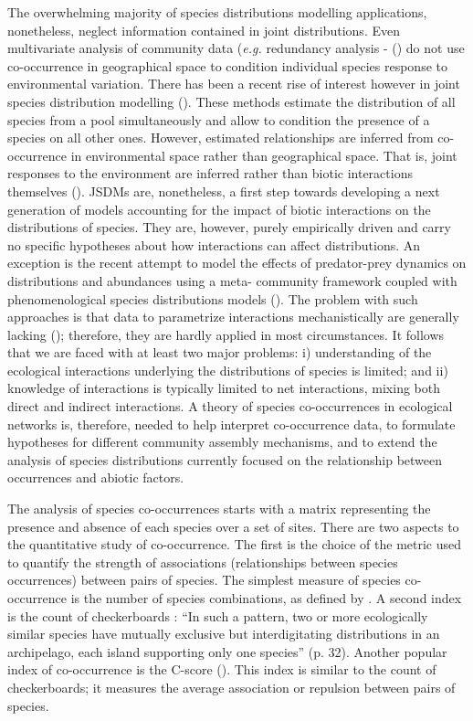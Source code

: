 The overwhelming majority of species distributions modelling applications, nonetheless, neglect information contained in joint distributions. Even multivariate analysis of community data (\textit{e.g.} redundancy analysis - (\citealt{Legendre2012Numerical}) do not use co-occurrence in geographical space to condition individual species response to environmental variation.  There has been a recent rise of interest however in joint species distribution modelling (\citealt{Clark2014More, Harris2015Estimating, Pollock2014Understanding}). These methods estimate the distribution of all species from a pool simultaneously and allow to condition the presence of a species on all other ones. However, estimated relationships are inferred from co-occurrence in environmental space rather than geographical space. That is, joint responses to the environment are inferred rather than biotic interactions themselves (\citealt{Baselga2009Individualistic}). JSDMs are, nonetheless, a first step towards developing a next generation of models accounting for the impact of biotic interactions on the distributions of species. They are, however, purely empirically driven and carry no specific hypotheses about how interactions can affect distributions. An exception is the recent attempt to model the effects of predator-prey dynamics on distributions and abundances using a meta- community framework coupled with phenomenological species distributions models (\citealt{Fordham2013Adapted}). The problem with such approaches is that data to parametrize interactions mechanistically are generally lacking (\citealt{Castilla2015Inferring}); therefore, they are hardly applied in most circumstances. It follows that we are faced with at least two major problems: i) understanding of the ecological interactions underlying the distributions of species is limited; and ii) knowledge of interactions is typically limited to net interactions, mixing both direct and indirect interactions. A theory of species co-occurrences in ecological networks is, therefore, needed to help interpret co-occurrence data, to formulate hypotheses for different community assembly mechanisms, and to extend the analysis of species distributions currently focused on the relationship between occurrences and abiotic factors.

The analysis of species co-occurrences starts with a matrix representing the presence and absence of each species over a set of sites. There are two aspects to the quantitative study of co-occurrence. The first is the choice of the metric used to quantify the strength of associations (relationships between species occurrences) between pairs of species. The simplest measure of species co-occurrence is the number of species combinations, as defined by \cite{Pielou1968Association}. A second
index is the count of checkerboards \cite{Diamond1975Assembly}: ``In such a
pattern, two or more ecologically similar species have mutually exclusive but
interdigitating distributions in an archipelago, each island supporting only
one species'' (p. 32). Another popular index of co-occurrence is the C-score
(\citealt{Stone1990Checkerboard}). This index is similar to the count of
checkerboards; it measures the average association or repulsion between pairs
of species.

